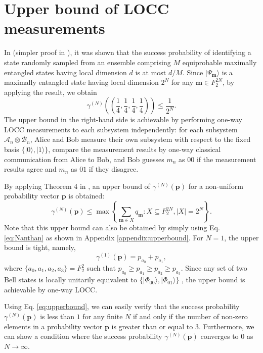 \documentclass[aps,prx,twocolumn,showpacs,amsmath,notitlepage,amssymb,superscriptaddress]{revtex4-1}
\newcommand{\ket}[1]{| {#1} \rangle}
\begin{document}
\section{Upper bound of LOCC measurements}
\label{sec:upperbound}
In \cite{optimalprob2} (simpler proof in \cite{optimalprob4}), it was shown that the success probability of identifying a state randomly sampled from an ensemble comprising $M$ equiprobable maximally entangled states having local dimension $d$ is at most $d/M$. Since $\ket{\Psi_{\mathbf{m}}}$ is a maximally entangled state having local dimension $2^N$ for any $\mathbf{m}\in F_2^{2N}$, by applying the result, we obtain
\begin{equation}
 \gamma^{(N)}\left(\left(\frac{1}{4},\frac{1}{4},\frac{1}{4},\frac{1}{4}\right)\right)\leq\frac{1}{2^N}.
 \label{eq:Nanthan}
\end{equation}
The upper bound in the right-hand side is achievable by performing one-way LOCC measurements to each subsystem independently: for each subsystem $\mathcal{A}_n\otimes\mathcal{B}_n$, Alice and Bob measure their own subsystem with respect to the fixed basis $\{\ket{0},\ket{1}\}$, compare the measurement results by one-way classical communication from Alice to Bob, and Bob guesses $m_n$ as $00$ if the measurement results agree and $m_n$ as $01$ if they disagree. 

By applying Theorem 4 in \cite{optimalprob6}, an upper bound of $\gamma^{(N)}(\mathbf{p})$ for a non-uniform probability vector $\mathbf{p}$ is obtained:
\begin{equation}
\label{eq:upperbound}
 \gamma^{(N)}(\mathbf{p})\leq\max\left\{\sum_{\mathbf{m}\in X}q_{\mathbf{m}}:X\subseteq F_2^{2N},|X|=2^N\right\}.
\end{equation}
Note that this upper bound can also be obtained by simply using Eq. \eqref{eq:Nanthan} as shown in Appendix \ref{appendix:upperbound}. For $N=1$, the upper bound is tight, namely,
\begin{equation}
 \gamma^{(1)}(\mathbf{p})= p_{a_0}+p_{a_1},
\end{equation}
where $\{a_0,a_1,a_2,a_3\}=F_2^2$ such that $p_{a_0}\geq p_{a_1}\geq p_{a_2}\geq p_{a_3}$. Since any set of two Bell states is locally unitarily equivalent to $\{\ket{\Phi_{00}},\ket{\Phi_{01}}\}$ \cite{LUequivalent}, the upper bound is achievable by one-way LOCC.

Using Eq. \eqref{eq:upperbound}, we can easily verify that the success probability $\gamma^{(N)}(\mathbf{p})$ is less than $1$ for any finite $N$ if and only if the number of non-zero elements in a probability vector $\mathbf{p}$ is greater than or equal to $3$. Furthermore, we can show a condition where the success probability $\gamma^{(N)}(\mathbf{p})$ converges to 0 as $N\rightarrow\infty$.
\end{document}
